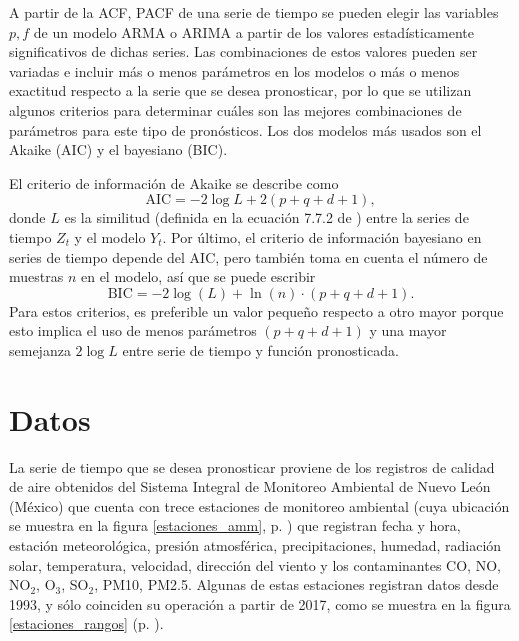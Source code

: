 \documentclass{elsarticle}
\begin{document}
A partir de la ACF, PACF de una serie de tiempo se pueden elegir las variables $p, f$ de un modelo ARMA o ARIMA a partir de los valores estadísticamente significativos de dichas series. Las combinaciones de estos valores pueden ser variadas e incluir más o menos parámetros en los modelos o más o menos exactitud respecto a la serie que se desea pronosticar, por lo que se utilizan algunos criterios para determinar cuáles son las mejores combinaciones de parámetros para este tipo de pronósticos. Los dos modelos más usados son el Akaike (AIC) y el bayesiano (BIC).

El criterio de información de Akaike se describe como
\begin{equation}
\mbox{AIC} = -2 \log{L} + 2 (p + q + d + 1),
\end{equation}
donde $L$ es la similitud (definida en la ecuación 7.7.2 de \cite{Hyndman2018}) entre la series de tiempo $Z_t$ y el modelo $Y_t$. Por último, el criterio de información bayesiano \cite{Albert2007} en series de tiempo depende del AIC, pero también toma en cuenta el número de muestras $n$ en el modelo, así que se puede escribir
\begin{equation}
    \mbox{BIC} = -2 \log(L) + \ln(n) \cdot (p + q + d + 1).
\end{equation}
Para estos criterios, es preferible un valor pequeño respecto a otro mayor porque esto implica el uso de menos parámetros $(p + q + d + 1)$ y una mayor semejanza $2\log{L}$ entre serie de tiempo y función pronosticada.

\section{Datos}
\label{datos}

La serie de tiempo que se desea pronosticar proviene de los registros de calidad de aire obtenidos del Sistema Integral de Monitoreo Ambiental de Nuevo León (México) \cite{aireNL} que cuenta con trece estaciones de monitoreo ambiental (cuya ubicación se muestra en la figura \ref{estaciones_amm}, p. \pageref{estaciones_amm}) que registran fecha y hora, estación meteorológica, presión atmosférica, precipitaciones, humedad, radiación solar, temperatura, velocidad, dirección del viento y los contaminantes CO, NO, NO$_2$, O$_3$, SO$_2$, PM10, PM2.5. Algunas de estas estaciones registran datos desde 1993, y sólo coinciden su operación a partir de 2017, como se muestra en la figura \ref{estaciones_rangos} (p. \pageref{estaciones_rangos}). 
\end{document}
